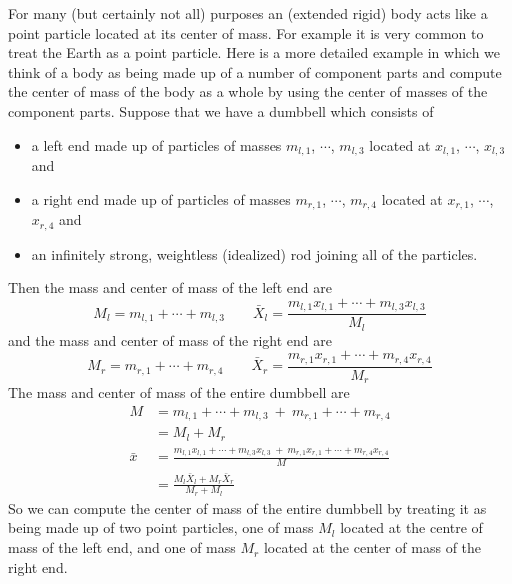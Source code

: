For many (but certainly not all) purposes an (extended rigid) body acts like
a point particle located at its center of mass. For example it is very
common to treat the Earth as a point particle. Here is a more detailed
example in which we think of a body as being made up of a number of component
parts and compute the center of mass of the body as a whole by using the
center of masses of the component parts. Suppose that we have a dumbbell
which consists of
\begin{itemize}\itemsep1pt \parskip0pt  %
\item a left end made up of particles of masses $m_{l,1}$, $\cdots$, $m_{l,3}$
located at $x_{l,1}$, $\cdots$, $x_{l,3}$ and
\item a right end made up of particles of masses $m_{r,1}$, $\cdots$, $m_{r,4}$
located at $x_{r,1}$, $\cdots$, $x_{r,4}$ and
\item an infinitely strong, weightless (idealized) rod joining all of the
particles.
\end{itemize}
Then the mass and center of mass of the left end are
\begin{equation*}
M_l=m_{l,1}+\cdots +m_{l,3}\qquad
\bar X_l = \frac{m_{l,1}x_{l,1}+\cdots +m_{l,3}x_{l,3}}{M_l}
\end{equation*}
and the mass and center of mass of the right end are
\begin{equation*}
M_r=m_{r,1}+\cdots +m_{r,4}\qquad
\bar X_r = \frac{m_{r,1}x_{r,1}+\cdots +m_{r,4}x_{r,4}}{M_r}
\end{equation*}
The mass and center of mass of the entire dumbbell are
\begin{align*}
M&= m_{l,1}+\cdots +m_{l,3}\  +\  m_{r,1}+\cdots +m_{r,4} \\
 &= M_l+M_r \\
\bar x &=\frac{m_{l,1}x_{l,1}+\cdots +m_{l,3}x_{l,3}\ +\
              m_{r,1}x_{r,1}+\cdots +m_{r,4}x_{r,4}}{M} \\
       &=\frac{M_l \bar X_l + M_r \bar X_r}{M_r+M_l}
\end{align*}
So we can compute the center of mass of the entire dumbbell by treating
it as being made up of two point particles, one of mass $M_l$ located at
the centre of mass of the left end, and one of mass $M_r$ located at the
center of mass of the right end.

